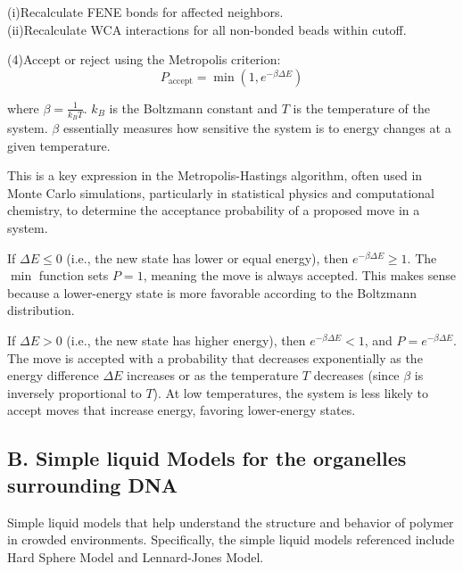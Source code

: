 \documentclass[12pt]{article}
\begin{document}
\begin{flushleft}
\setlength{\parindent}{100pt}(i)Recalculate FENE bonds for affected neighbors.\\
(ii)Recalculate WCA interactions for all non-bonded beads within cutoff.\\
\setlength{\parindent}{0pt}


\setlength{\parindent}{6em}(4)Accept or reject using the Metropolis criterion:
\setlength{\parindent}{0pt}
\begin{equation}
P_{\text{accept}} = \min \left(1, e^{-\beta \Delta E}\right)
\end{equation}

where $\beta = \frac{1}{k_B T}$. $k_B$ is the Boltzmann constant and $T$ is the temperature of the system. $\beta$ essentially measures how sensitive the system is to energy changes at a given temperature.

\setlength{\parindent}{30pt}

This is a key expression in the Metropolis-Hastings algorithm, often used in Monte Carlo simulations, particularly in statistical physics and computational chemistry, to determine the acceptance probability of a proposed move in a system.




If $\Delta E \leq 0$ (i.e., the new state has lower or equal energy), then $e^{-\beta \Delta E} \geq 1$. The $\min$ function sets $P = 1$, meaning the move is always accepted. This makes sense because a lower-energy state is more favorable according to the Boltzmann distribution.

If $\Delta E > 0$ (i.e., the new state has higher energy), then $e^{-\beta \Delta E} < 1$, and $P = e^{-\beta \Delta E}$. The move is accepted with a probability that decreases exponentially as the energy difference $\Delta E$ increases or as the temperature $T$ decreases (since $\beta$ is inversely proportional to $T$). At low temperatures, the system is less likely to accept moves that increase energy, favoring lower-energy states.

\vspace{-1em} 
\subsection*{B. Simple liquid Models for the organelles surrounding DNA}

Simple liquid models that help understand the structure and behavior of polymer in crowded environments. Specifically, the simple liquid models referenced include Hard Sphere Model and Lennard-Jones Model. 


\end{flushleft}
\end{document}

